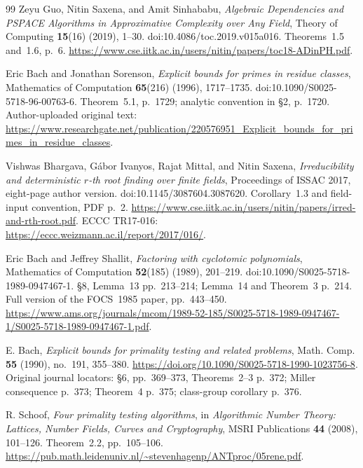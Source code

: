 \documentclass[11pt,a4paper]{article}
\begin{document}
\begin{thebibliography}{99}
Zeyu Guo, Nitin Saxena, and Amit Sinhababu,
\emph{Algebraic Dependencies and PSPACE Algorithms in Approximative
Complexity over Any Field}, Theory of Computing \textbf{15}(16)
(2019), 1--30. doi:10.4086/toc.2019.v015a016.
Theorems~1.5 and~1.6, p.~6.
\url{https://www.cse.iitk.ac.in/users/nitin/papers/toc18-ADinPH.pdf}.



Eric Bach and Jonathan Sorenson, \emph{Explicit bounds for primes in
residue classes}, Mathematics of Computation \textbf{65}(216)
(1996), 1717--1735. doi:10.1090/S0025-5718-96-00763-6.
Theorem~5.1, p.~1729; analytic convention in \S2, p.~1720.
Author-uploaded original text:
\url{https://www.researchgate.net/publication/220576951_Explicit_bounds_for_primes_in_residue_classes}.



Vishwas Bhargava, G\'abor Ivanyos, Rajat Mittal, and Nitin Saxena,
\emph{Irreducibility and deterministic $r$-th root finding over finite
fields}, Proceedings of ISSAC 2017, eight-page author version.
doi:10.1145/3087604.3087620.
Corollary~1.3 and field-input convention, PDF p.~2.
\url{https://www.cse.iitk.ac.in/users/nitin/papers/irred-and-rth-root.pdf}.
ECCC TR17-016: \url{https://eccc.weizmann.ac.il/report/2017/016/}.




Eric Bach and Jeffrey Shallit, \emph{Factoring with cyclotomic polynomials},
Mathematics of Computation \textbf{52}(185) (1989), 201--219.
doi:10.1090/S0025-5718-1989-0947467-1.
\S8, Lemma~13 pp.~213--214; Lemma~14 and Theorem~3 p.~214.
Full version of the FOCS~1985 paper, pp.~443--450.
\url{https://www.ams.org/journals/mcom/1989-52-185/S0025-5718-1989-0947467-1/S0025-5718-1989-0947467-1.pdf}.



E. Bach, \emph{Explicit bounds for primality testing and related problems},
Math. Comp. \textbf{55} (1990), no.~191, 355--380.
\url{https://doi.org/10.1090/S0025-5718-1990-1023756-8}.
Original journal locators: \S6, pp.~369--373, Theorems~2--3 p.~372;
Miller consequence p.~373; Theorem~4 p.~375; class-group corollary p.~376.



R. Schoof, \emph{Four primality testing algorithms}, in
\emph{Algorithmic Number Theory: Lattices, Number Fields, Curves and Cryptography},
MSRI Publications \textbf{44} (2008), 101--126.
Theorem~2.2, pp.~105--106.
\url{https://pub.math.leidenuniv.nl/~stevenhagenp/ANTproc/05rene.pdf}.




\end{thebibliography}
\end{document}
